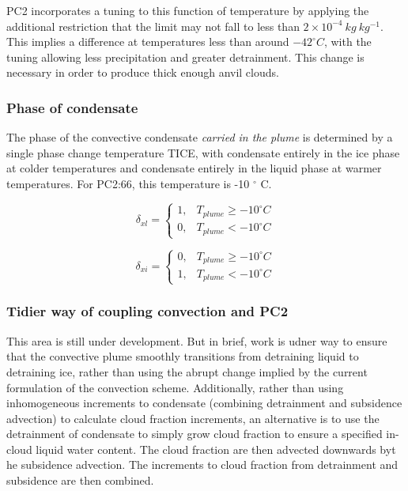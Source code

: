 \documentclass{UMDP_article}
\begin{document}
PC2 incorporates a tuning to this function of temperature by applying
the additional restriction that the limit may not fall to less than
$2 \times 10^{-4}~kg~kg^{-1}$. This implies a difference at temperatures
less than around $-42 ^{\circ} C$, with the tuning allowing less
precipitation and greater detrainment. This change is necessary
in order to produce thick enough anvil clouds.

\subsubsection{Phase of condensate}
\label{sec:plume_phase}
The phase of the convective condensate \textit{carried in the plume}
is determined by a single phase change temperature TICE, with
condensate entirely in the
ice phase at colder temperatures and condensate entirely in the liquid
phase at warmer temperatures. For PC2:66, this temperature is -10 $^{\circ}$ C.

\begin{equation}
\delta_{xl} = \left\{  \begin{array}{ll}
                  1,                             &  T_{plume} \ge -10 ^{\circ} C \\
                  0,                             &  T_{plume} <  -10 ^{\circ} C
              \end{array} \right.
\end{equation} 

\begin{equation}
\delta_{xi} = \left\{  \begin{array}{ll}
                  0,                             &  T_{plume} \ge -10 ^{\circ} C \\
                  1,                             &  T_{plume} <  -10 ^{\circ} C
              \end{array} \right.
\end{equation} 

\subsubsection{Tidier way of coupling convection and PC2}
\label{sec:conv-simpler} 

This area is still under development. But in brief, work is udner way to ensure that the 
convective plume smoothly transitions from detraining liquid to detraining ice, rather 
than using the abrupt change implied by the current formulation of the convection scheme. 
Additionally, rather than using inhomogeneous increments to condensate (combining detrainment 
and subsidence advection) to calculate cloud fraction increments, an alternative is to use 
the detrainment of condensate to simply grow cloud fraction to ensure a specified in-cloud 
liquid water content. The cloud fraction are then advected downwards byt he subsidence advection.
 The increments to cloud fraction from detrainment and subsidence are then combined. 
\end{document}

